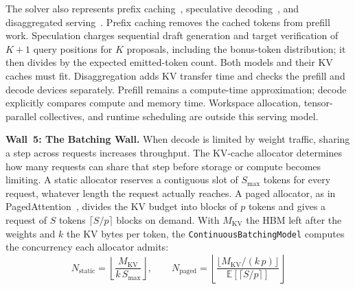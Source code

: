 \documentclass[10pt,twocolumn]{article}
\begin{document}
The solver also represents prefix caching~\citep{zheng2024sglang}, speculative decoding~\citep{leviathan2023fast}, and disaggregated serving~\citep{patel2024}. Prefix caching removes the cached tokens from prefill work. Speculation charges sequential draft generation and target verification of $K+1$ query positions for $K$ proposals, including the bonus-token distribution; it then divides by the expected emitted-token count. Both models and their KV caches must fit. Disaggregation adds KV transfer time and checks the prefill and decode devices separately. Prefill remains a compute-time approximation; decode explicitly compares compute and memory time. Workspace allocation, tensor-parallel collectives, and runtime scheduling are outside this serving model.

\textbf{Wall~5: The Batching Wall.} When decode is limited by weight traffic, sharing a step across requests increases throughput. The KV-cache allocator determines how many requests can share that step before storage or compute becomes limiting. A static allocator reserves a contiguous slot of $S_{\max}$ tokens for every request, whatever length the request actually reaches. A paged allocator, as in PagedAttention~\citep{kwon2023}, divides the KV budget into blocks of $p$ tokens and gives a request of $S$ tokens $\lceil S/p \rceil$ blocks on demand. With $M_{\text{KV}}$ the HBM left after the weights and $k$ the KV bytes per token, the \texttt{ContinuousBatchingModel} computes the concurrency each allocator admits:
\begin{equation}
\label{eq:pagedkv}
N_{\text{static}} = \left\lfloor \frac{M_{\text{KV}}}{k\,S_{\max}} \right\rfloor, \qquad
N_{\text{paged}} = \left\lfloor \frac{\lfloor M_{\text{KV}}/(k\,p) \rfloor}{\mathbb{E}\left[\lceil S/p \rceil\right]} \right\rfloor
\end{equation}
\end{document}
